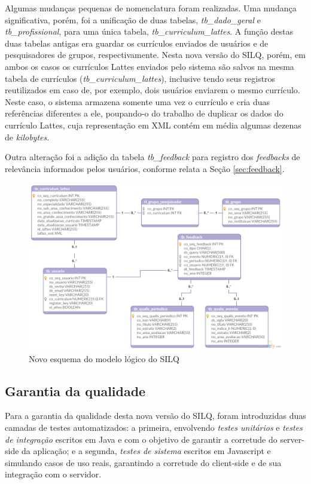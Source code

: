 \documentclass[12pt]{article}
\begin{document}
Algumas mudanças pequenas de nomenclatura foram realizadas. Uma mudança significativa, porém, foi a unificação de duas tabelas, \textit{tb\_dado\_geral} e \textit{tb\_profissional}, para uma única tabela, \textit{tb\_curriculum\_lattes}. A função destas duas tabelas antigas era guardar os currículos enviados de usuários e de pesquisadores de grupos, respectivamente. Nesta nova versão do SILQ, porém, em ambos os casos os currículos Lattes enviados pelo sistema são salvos na mesma tabela de currículos (\textit{tb\_curriculum\_lattes}), inclusive tendo seus registros reutilizados em caso de, por exemplo, dois usuários enviarem o mesmo currículo. Neste caso, o sistema armazena somente uma vez o currículo e cria duas referências diferentes a ele, poupando-o do trabalho de duplicar os dados do currículo Lattes, cuja representação em XML contém em média algumas dezenas de \textit{kilobytes}.

Outra alteração foi a adição da tabela \textit{tb\_feedback} para registro dos \textit{feedbacks} de relevância informados pelos usuários, conforme relata a Seção \ref{sec:feedback}.

\begin{figure}[!h]
   \centering
   \caption{Novo esquema do modelo lógico do SILQ}
   \label{fig:modelo-logico}
   \includegraphics[width=\textwidth]{../figuras/modelo-logico.png}
\end{figure}

\subsection{Garantia da qualidade}

Para a garantia da qualidade desta nova versão do SILQ, foram introduzidas duas camadas de testes automatizados: a primeira, envolvendo \textit{testes unitários} e \textit{testes de integração} escritos em Java e com o objetivo de garantir a corretude do server-side da aplicação; e a segunda, \textit{testes de sistema} escritos em Javascript e simulando casos de uso reais, garantindo a corretude do client-side e de sua integração com o servidor.
\end{document}
